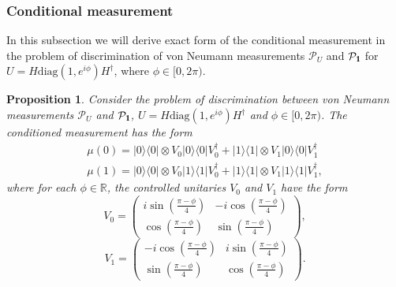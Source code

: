 \documentclass[preprint,12pt, a4paper]{elsarticle}
\newcommand{\ket}[1]{\ensuremath{|#1\rangle}}
\newcommand{\bra}[1]{\ensuremath{\langle#1|}}
\newcommand{\ketbra}[2]{\ensuremath{\ket{#1}\bra{#2}}}
\newcommand{\proj}[1]{\ensuremath{\ketbra{#1}{#1}}}
\newcommand{\1}{{\rm 1\hspace{-0.9mm}l}}
\newcommand{\Id}{{\rm 1\hspace{-0.9mm}l}}
\newcommand{\PP}{\mathcal{P}}
\newcommand{\diag}{\mathrm{diag}}
\newtheorem{proposition}{Proposition}
\begin{document}
\subsubsection{Conditional measurement}\label{sec_example_final_measurement}
In this subsection we will derive exact form of the conditional measurement in the
problem of discrimination of von Neumann measurements $\PP_U$ and $\PP_{\Id}$
for $U = H \diag(1, e^{i \phi}) H^\dagger$, where $\phi \in [0, 2\pi)$.


\begin{proposition}
	Consider the problem of discrimination between von Neumann measurements $\PP_U$ 
	and $\PP_\1$, $U = H\diag(1, e^{i \phi}) H^\dagger $ and $\phi \in [0, 
	2\pi)$.  
The  conditioned measurement has the form
\begin{equation}
\begin{split}
\mu(0) = \proj{0} \otimes V_0 \proj{0} V_0^\dagger +  \proj{1} \otimes V_1 
\proj{0} V_1^\dagger  \\ 
\mu(1) = \proj{0} \otimes V_0 \proj{1} V_0^\dagger +  \proj{1} \otimes V_1 
\proj{1} V_1^\dagger,
\end{split}
\end{equation}
where for each $\phi \in \mathbb{R}$,  the controlled unitaries $V_0$ and $V_1$ 
have the form
\begin{equation}
V_0 = \left(\begin{array}{cc}i \sin\left( \frac{\pi - \phi}{4} \right)&-i 
\cos\left( \frac{\pi - \phi}{4} \right)\\ \cos\left( \frac{\pi - 
\phi}{4}\right)& \sin\left( \frac{\pi - \phi}{4} \right)\end{array}\right),
\end{equation}
\begin{equation}
V_1 = \left(\begin{array}{cc}-i \cos\left(\frac{\pi - \phi}{4}\right) &i 
\sin\left( \frac{\pi - \phi}{4}\right)\\\sin\left( \frac{\pi - \phi}{4} \right) 
&  \cos\left( \frac{\pi - \phi}{4} \right) \end{array}\right).
\end{equation}
\end{proposition}
\end{document}
